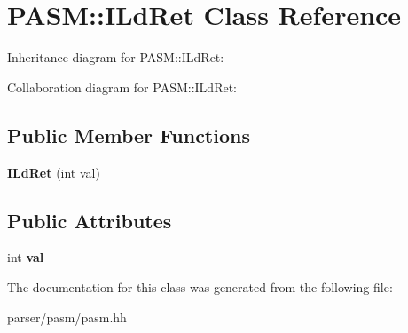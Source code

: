 \hypertarget{classPASM_1_1ILdRet}{}\section{P\+A\+SM\+:\+:I\+Ld\+Ret Class Reference}
\label{classPASM_1_1ILdRet}


Inheritance diagram for P\+A\+SM\+:\+:I\+Ld\+Ret\+:


Collaboration diagram for P\+A\+SM\+:\+:I\+Ld\+Ret\+:
\subsection*{Public Member Functions}
\begin{DoxyCompactItemize}
\item 
\mbox{\label{classPASM_1_1ILdRet_a324c640c9ac31aa90f13c3b0de2d1807}} 
{\bfseries I\+Ld\+Ret} (int val)
\end{DoxyCompactItemize}
\subsection*{Public Attributes}
\begin{DoxyCompactItemize}
\item 
\mbox{\label{classPASM_1_1ILdRet_ad59a12544b8048eb69c16b14b2e35dd7}} 
int {\bfseries val}
\end{DoxyCompactItemize}


The documentation for this class was generated from the following file\+:\begin{DoxyCompactItemize}
\item 
parser/pasm/pasm.\+hh\end{DoxyCompactItemize}
